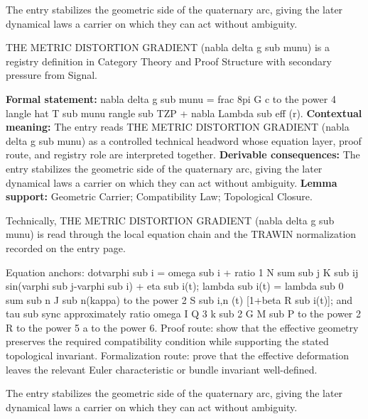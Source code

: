 The entry stabilizes the geometric side of the quaternary arc, giving the later dynamical laws a carrier on which they can act without ambiguity.
\clearpage


\begingroup\small
{}
THE METRIC DISTORTION GRADIENT (nabla delta g sub munu) is a registry definition in Category Theory and Proof Structure with secondary pressure from Signal.

\begingroup\footnotesize\setlength{\emergencystretch}{3em}\sloppy
\textbf{Formal statement:} nabla delta g sub munu = frac 8pi G c to the power 4 langle hat T sub munu rangle sub TZP + nabla Lambda sub eff (r). \textbf{Contextual meaning:} The entry reads THE METRIC DISTORTION GRADIENT (nabla delta g sub munu) as a controlled technical headword whose equation layer, proof route, and registry role are interpreted together. \textbf{Derivable consequences:} The entry stabilizes the geometric side of the quaternary arc, giving the later dynamical laws a carrier on which they can act without ambiguity. \textbf{Lemma support:} Geometric Carrier; Compatibility Law; Topological Closure.\par
\endgroup

Technically, THE METRIC DISTORTION GRADIENT (nabla delta g sub munu) is read through the local equation chain and the TRAWIN normalization recorded on the entry page.

Equation anchors: dotvarphi sub i = omega sub i + ratio 1 N sum sub j K sub ij sin(varphi sub j-varphi sub i) + eta sub i(t); lambda sub i(t) = lambda sub 0 sum sub n J sub n(kappa) to the power 2 S sub i,n (t) [1+beta R sub i(t)]; and tau sub sync approximately ratio omega I Q 3 k sub 2 G M sub P to the power 2 R to the power 5 a to the power 6. Proof route: show that the effective geometry preserves the required compatibility condition while supporting the stated topological invariant. Formalization route: prove that the effective deformation leaves the relevant Euler characteristic or bundle invariant well-defined.

The entry stabilizes the geometric side of the quaternary arc, giving the later dynamical laws a carrier on which they can act without ambiguity.
\endgroup

